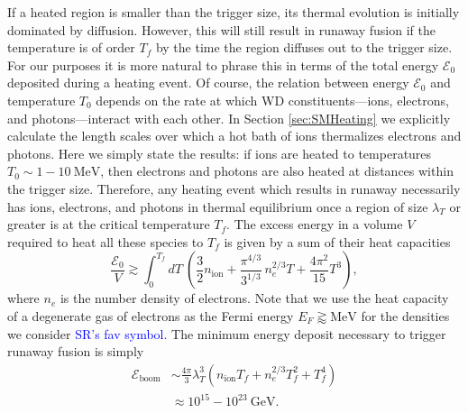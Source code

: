 \documentclass[preprintnumbers,amsmath,amssymb,prd, superscriptaddress,twocolumn]{revtex4}
\newcommand{\Ez}{\mathcal{E}_0}
\newcommand{\Eboom}{\mathcal{E}_\text{boom}}
\newcommand{\GeV}{\text{GeV}}
\newcommand{\MeV}{\text{MeV}}
\begin{document}
If a heated region is smaller than the trigger size, its thermal evolution is initially dominated by diffusion.
However, this will still result in runaway fusion if the temperature is of order $T_f$ by the time the region diffuses out to the trigger size.
For our purposes it is more natural to phrase this in terms of the total energy $\Ez$ deposited during a heating event.
Of course, the relation between energy $\Ez$ and temperature $T_0$ depends on the rate at which WD constituents---ions, electrons, and photons---interact with each other. 
In Section \ref{sec:SMHeating} we explicitly calculate the length scales over which a hot bath of ions thermalizes electrons and photons. 
Here we simply state the results: if ions are heated to temperatures $T_0 \sim 1 - 10 ~\MeV$, then electrons and photons are also heated at distances within the trigger size. 
Therefore, any heating event which results in runaway necessarily has ions, electrons, and photons in thermal equilibrium once a region of size $\lambda_T$ or greater is at the critical temperature $T_f$. 
The excess energy in a volume $V$ required to heat all these species to $T_f$ is given by a sum of their heat capacities
\begin{equation}
\label{eq:heatcapacity}
  \frac{\Ez}{V} \gtrsim \int_0^{T_f} dT ~\left(\frac32 n_\text{ion} + \frac{\pi^{4/3}}{3^{1/3}}\, n_e^{2/3} T + \frac{4 \pi^2}{15} T^3 \right),
\end{equation}
where $n_e$ is the number density of electrons.
Note that we use the heat capacity of a degenerate gas of electrons as the Fermi energy $E_F \gtrapprox \MeV$ for the densities we consider \textcolor{blue}{SR's fav symbol}.
The minimum energy deposit necessary to trigger runaway fusion is simply
\begin{align}
\label{eq:Eboom}
\Eboom &\sim \frac{4 \pi}{3} \lambda_T^3 (n_\text{ion} T_f + n_e^{2/3} T_f^2 + T_f^4) \\
         &\approx 10^{15} - 10^{23} ~\GeV \nonumber.
\end{align}
\end{document}
